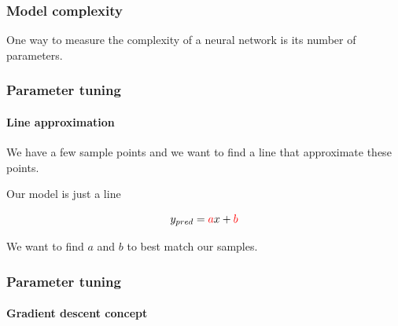 \documentclass[9pt]{beamer}
\begin{document}
\begin{frame}
  \frametitle{Model complexity}

  One way to measure the complexity of a neural network is its number
  of parameters.

  \bigskip

  \begin{itemize}
    \bigskip
  \end{itemize}

  \bigskip
\end{frame}

\begin{frame}
  \frametitle{Parameter tuning}

  \framesubtitle{Line approximation}

  We have a few sample points and we want to find a line that
  approximate these points.

  \begin{center}
    \scalebox{0.8}{
      
    }
  \end{center}

  Our model is just a line

  \[
  y_{pred} = \textcolor{red}{a}x + \textcolor{red}{b}
  \]

  \bigskip

  We want to find $a$ and $b$ to best match our samples.

\end{frame}

\begin{frame}
  \frametitle{Parameter tuning}

  \framesubtitle{Gradient descent concept}

  \begin{center}
    \scalebox{0.8}{
      
    }
  \end{center}

\end{frame}
\end{document}
